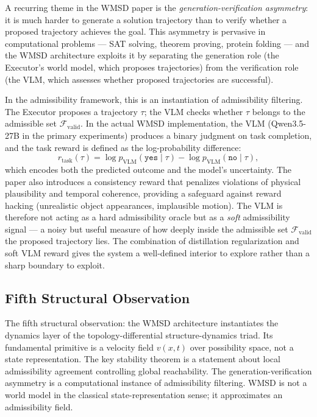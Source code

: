 \documentclass[12pt, a4paper]{article}
\theoremstyle{plain}
\theoremstyle{definition}
\theoremstyle{remark}
\newcommand{\cF}{\mathcal{F}}
\begin{document}
A recurring theme in the WMSD paper is the \emph{generation-verification
asymmetry}: it is much harder to generate a solution trajectory than to verify
whether a proposed trajectory achieves the goal. This asymmetry is pervasive in
computational problems \cite{pearl2009causality} --- SAT solving, theorem
proving, protein folding --- and the WMSD architecture exploits it by separating
the generation role (the Executor's world model, which proposes trajectories)
from the verification role (the VLM, which assesses whether proposed trajectories
are successful).

In the admissibility framework, this is an instantiation of admissibility
filtering. The Executor proposes a trajectory $\tau$; the VLM checks whether
$\tau$ belongs to the admissible set $\cF_{\mathrm{valid}}$. In the actual
WMSD implementation, the VLM (Qwen3.5-27B in the primary experiments) produces
a binary judgment on task completion, and the task reward is defined as the
log-probability difference:
\begin{equation}
  r_{\mathrm{task}}(\tau) = \log p_{\mathrm{VLM}}(\texttt{yes} \mid \tau)
  - \log p_{\mathrm{VLM}}(\texttt{no} \mid \tau),
\end{equation}
which encodes both the predicted outcome and the model's uncertainty.
The paper also introduces a consistency reward that penalizes violations
of physical plausibility and temporal coherence, providing a safeguard
against reward hacking (unrealistic object appearances, implausible motion).
The VLM is therefore not acting as a hard admissibility oracle but as a
\emph{soft} admissibility signal --- a noisy but useful measure of how deeply
inside the admissible set $\cF_{\mathrm{valid}}$ the proposed trajectory lies.
The combination of distillation regularization and soft VLM reward gives the
system a well-defined interior to explore rather than a sharp boundary to
exploit.

\subsection{Fifth Structural Observation}

The fifth structural observation: the WMSD architecture instantiates the
dynamics layer of the topology-differential structure-dynamics triad. Its
fundamental primitive is a velocity field $v(x,t)$ over possibility space,
not a state representation. The key stability theorem is a statement about
local admissibility agreement controlling global reachability. The
generation-verification asymmetry is a computational instance of admissibility
filtering. WMSD is not a world model in the classical state-representation
sense; it approximates an admissibility field.
\end{document}
